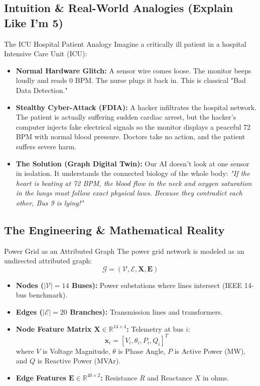 \documentclass[11pt,a4paper]{article}
\begin{document}
\subsection{Intuition \& Real-World Analogies (Explain Like I'm 5)}

\begin{analogybox}{The ICU Hospital Patient Analogy}
Imagine a critically ill patient in a hospital Intensive Care Unit (ICU):
\begin{itemize}
    \item \textbf{Normal Hardware Glitch:} A sensor wire comes loose. The monitor beeps loudly and reads 0 BPM. The nurse plugs it back in. This is classical "Bad Data Detection."
    \item \textbf{Stealthy Cyber-Attack (FDIA):} A hacker infiltrates the hospital network. The patient is actually suffering sudden cardiac arrest, but the hacker's computer injects fake electrical signals so the monitor displays a peaceful 72 BPM with normal blood pressure. Doctors take no action, and the patient suffers severe harm.
    \item \textbf{The Solution (Graph Digital Twin):} Our AI doesn't look at one sensor in isolation. It understands the connected biology of the whole body: \textit{"If the heart is beating at 72 BPM, the blood flow in the neck and oxygen saturation in the lungs must follow exact physical laws. Because they contradict each other, Bus 9 is lying!"}
\end{itemize}
\end{analogybox}

\subsection{The Engineering \& Mathematical Reality}

\begin{techbox}{Power Grid as an Attributed Graph}
The power grid network is modeled as an undirected attributed graph:
$$\mathcal{G} = (\mathcal{V}, \mathcal{E}, \mathbf{X}, \mathbf{E})$$
\begin{itemize}
    \item \textbf{Nodes ($|\mathcal{V}| = 14$ Buses):} Power substations where lines intersect (IEEE 14-bus benchmark).
    \item \textbf{Edges ($|\mathcal{E}| = 20$ Branches):} Transmission lines and transformers.
    \item \textbf{Node Feature Matrix $\mathbf{X} \in \mathbb{R}^{14 \times 4}$:} Telemetry at bus $i$:
    $$\mathbf{x}_i = [V_i, \theta_i, P_i, Q_i]^T$$
    where $V$ is Voltage Magnitude, $\theta$ is Phase Angle, $P$ is Active Power (MW), and $Q$ is Reactive Power (MVAr).
    \item \textbf{Edge Features $\mathbf{E} \in \mathbb{R}^{40 \times 2}$:} Resistance $R$ and Reactance $X$ in ohms.
\end{itemize}
\end{techbox}
\end{document}
